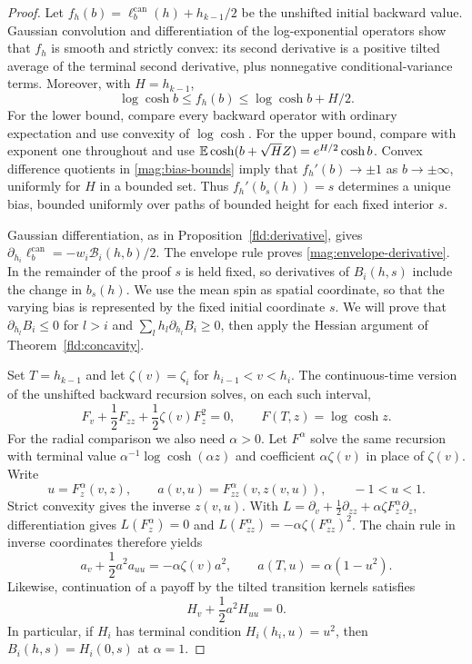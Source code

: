 \begin{proof}
Let $f_h(b)=\ell_b^{\mathrm{can}}(h)+h_{k-1}/2$ be the unshifted initial
backward value. Gaussian convolution and differentiation of the
log-exponential operators show that $f_h$ is smooth and strictly convex:
its second derivative is a positive tilted average of the terminal
second derivative, plus nonnegative conditional-variance terms. Moreover,
with $H=h_{k-1}$,
\begin{equation}\label{mag:bias-bounds}
 \log\cosh b\le f_h(b)\le\log\cosh b+H/2.
\end{equation}
For the lower bound, compare every backward operator with ordinary
expectation and use convexity of $\log\cosh$. For the upper bound, compare
with exponent one throughout and use
$\mathbb E\cosh(b+\sqrt H Z)=e^{H/2}\cosh b$.
Convex difference quotients in \eqref{mag:bias-bounds} imply that
$f_h'(b)\to\pm1$ as $b\to\pm\infty$, uniformly for $H$ in a bounded
set. Thus $f_h'(b_s(h))=s$ determines a unique bias, bounded uniformly
over paths of bounded height for each fixed interior $s$.

Gaussian differentiation, as in Proposition~\ref{fld:derivative}, gives
$\partial_{h_i}\ell_b^{\mathrm{can}}=-w_i\mathcal B_i(h,b)/2$.
The envelope rule proves \eqref{mag:envelope-derivative}. In the remainder
of the proof $s$ is held fixed, so derivatives of $B_i(h,s)$ include the
change in $b_s(h)$. We use the mean spin as spatial coordinate, so that
the varying bias is represented by the fixed initial coordinate $s$.
We will prove that $\partial_{h_l}B_i\le0$ for $l>i$ and
$\sum_l h_l\partial_{h_l}B_i\ge0$, then apply the Hessian argument of
Theorem~\ref{fld:concavity}.

Set $T=h_{k-1}$ and let $\zeta(v)=\zeta_i$ for
$h_{i-1}<v<h_i$. The continuous-time version of the unshifted backward
recursion solves, on each such interval,
\[
 F_v+\frac12F_{zz}+\frac12\zeta(v)F_z^2=0,
 \qquad F(T,z)=\log\cosh z.
\]
For the radial comparison we also need $\alpha>0$. Let $F^\alpha$ solve
the same recursion with terminal value
$\alpha^{-1}\log\cosh(\alpha z)$ and coefficient
$\alpha\zeta(v)$ in place of $\zeta(v)$. Write
\[
 u=F_z^\alpha(v,z),\qquad
 a(v,u)=F_{zz}^\alpha(v,z(v,u)),\qquad -1<u<1.
\]
Strict convexity gives the inverse $z(v,u)$. With
$L=\partial_v+\tfrac12\partial_{zz}
             +\alpha\zeta F_z^\alpha\partial_z$,
differentiation gives
$L(F_z^\alpha)=0$ and
$L(F_{zz}^\alpha)=-\alpha\zeta(F_{zz}^\alpha)^2$.
The chain rule in inverse coordinates therefore yields
\begin{equation}\label{mag:inverse-PDE}
 a_v+\frac12a^2a_{uu}=-\alpha\zeta(v)a^2,
 \qquad a(T,u)=\alpha(1-u^2).
\end{equation}
Likewise, continuation of a payoff by the tilted transition kernels
satisfies
\begin{equation}\label{mag:continuation-PDE}
 H_v+\frac12a^2H_{uu}=0.
\end{equation}
In particular, if $H_i$ has terminal condition $H_i(h_i,u)=u^2$, then
$B_i(h,s)=H_i(0,s)$ at $\alpha=1$.


\end{proof}
